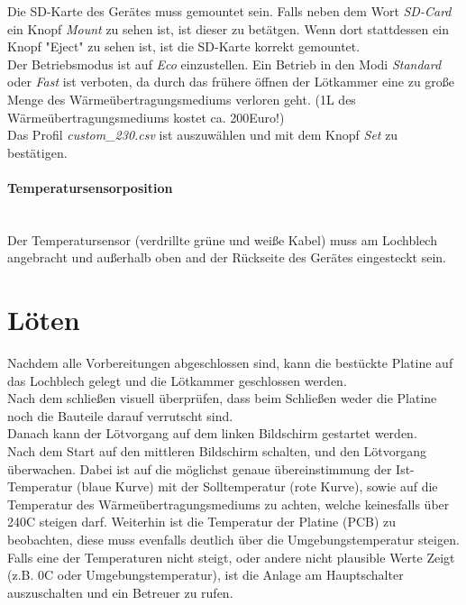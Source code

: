 \documentclass{\basedir/fablab-document}
\renewcommand{\todo}[1]{\textbf{\color{red}{TODO: #1}}}
\begin{document}
Die SD-Karte des Ger{\"a}tes muss gemountet sein. Falls neben dem Wort \textit{SD-Card} ein Knopf \textit{Mount} zu sehen ist, ist dieser zu bet{\"a}tgen. Wenn dort stattdessen ein Knopf "Eject" zu sehen ist, ist die SD-Karte korrekt gemountet.\\

Der Betriebsmodus ist auf \textit{Eco} einzustellen. Ein Betrieb in den Modi \textit{Standard} oder \textit{Fast} ist verboten, da durch das fr{\"u}here {\"o}ffnen der L{\"o}tkammer eine zu gro{\ss}e Menge des W{\"a}rme{\"u}bertragungsmediums verloren geht. (1L des W{\"a}rme{\"u}bertragungsmediums kostet ca. 200Euro!)\\

Das Profil \textit{custom\_230.csv} ist auszuw{\"a}hlen und mit dem Knopf \textit{Set} zu best{\"a}tigen.\\
\paragraph{Temperatursensorposition}\\
Der Temperatursensor (verdrillte gr{\"u}ne und wei{\ss}e Kabel) muss am Lochblech angebracht und au{\ss}erhalb oben and der R{\"u}ckseite des Ger{\"a}tes eingesteckt sein.


\section{L{\"o}ten}

Nachdem alle Vorbereitungen abgeschlossen sind, kann die best{\"u}ckte Platine auf das Lochblech gelegt und die L{\"o}tkammer geschlossen werden.\\
Nach dem schlie{\ss}en visuell {\"u}berpr{\"u}fen, dass beim Schlie{\ss}en weder die Platine noch die Bauteile darauf verrutscht sind.\\
Danach kann der L{\"o}tvorgang auf dem linken Bildschirm gestartet werden.\\
Nach dem Start auf den mittleren Bildschirm schalten, und den L{\"o}tvorgang {\"u}berwachen. Dabei ist auf die m{\"o}glichst genaue {\"u}bereinstimmung der Ist-Temperatur (blaue Kurve) mit der Solltemperatur (rote Kurve), sowie auf die Temperatur des W{\"a}rme{\"u}bertragungsmediums zu achten, welche keinesfalls {\"u}ber 240\textdegree C steigen darf. Weiterhin ist die Temperatur der Platine (PCB) zu beobachten, diese muss evenfalls deutlich über die Umgebungstemperatur steigen. Falls eine der Temperaturen nicht steigt, oder andere nicht plausible Werte Zeigt (z.B. 0\textdegree C oder Umgebungstemperatur), ist die Anlage am Hauptschalter auszuschalten und ein Betreuer zu rufen.
\end{document}
